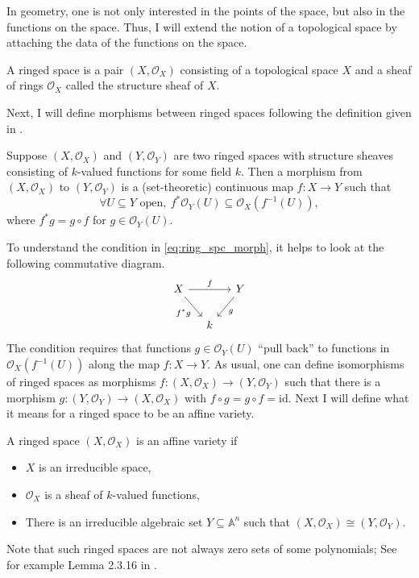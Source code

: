 In geometry, one is not only interested in the points of the space,
but also in the functions on the space. Thus, I will extend the notion of
a topological space by attaching the data of the functions on the space.
\begin{defin}
  A ringed space is a pair $(X,\mathscr{O}_{X})$ consisting of a topological
  space $X$ and a sheaf of rings $\mathscr{O}_{X}$ called the structure
  sheaf of $X$.
\end{defin}
Next, I will define morphisms between ringed spaces following the
definition given in \cite{gathmann}.
\begin{defin}
  Suppose $(X,\mathscr{O}_{X})$ and $(Y,\mathscr{O}_{Y})$ are two ringed
  spaces with structure sheaves consisting of $k$-valued functions
  for some field $k$. Then a morphism from $(X,\mathscr{O}_{X})$ to
  $(Y,\mathscr{O}_{Y})$ is a (set-theoretic) continuous map
  $f:X\to Y$ such that
  \begin{equation}\label{eq:ring_spc_morph}
    \forall U\subseteq Y\text{ open},\ f^{\ast}\mathscr{O}_{Y}(U)
    \subseteq \mathscr{O}_{X}(f^{-1}(U)),
  \end{equation}
  where $f^{\ast}g=g\circ f$ for $g\in\mathscr{O}_{Y}(U)$.
\end{defin}
To understand the condition in \eqref{eq:ring_spc_morph}, it helps to look
at the following commutative diagram.
\[\begin{tikzcd}[column sep=small]
    {X} && {Y} \\
    & k
    \arrow["{f^{\ast}g}"', from=1-1, to=2-2]
    \arrow["g", from=1-3, to=2-2]
    \arrow["f", from=1-1, to=1-3]
  \end{tikzcd}\]
The condition requires that functions $g\in\mathscr{O}_{Y}(U)$ ``pull back''
to functions in $\mathscr{O}_{X}(f^{-1}(U))$ along the map $f:X\to Y$. As
usual, one can define isomorphisms of ringed spaces as morphisms
$f:(X,\mathscr{O}_{X})\to (Y,\mathscr{O}_{Y})$ such that there is a morphism
$g:(Y,\mathscr{O}_{Y})\to (X,\mathscr{O}_{X})$ with $f\circ g=g\circ f
=\text{id}$. Next I will define what it means for a ringed space to be
an affine variety.

\begin{defin}
  A ringed space $(X,\mathscr{O}_{X})$ is an affine variety if
  \begin{itemize}
    \item $X$ is an irreducible space,
    \item $\mathscr{O}_{X}$ is a sheaf of $k$-valued functions,
    \item There is an irreducible algebraic set $Y\subseteq \mathbb{A}^{n}$
          such that $(X,\mathscr{O}_{X})\cong (Y,\mathscr{O}_{Y})$.
  \end{itemize}
\end{defin}
Note that such ringed spaces are not always zero sets of some polynomials;
See for example Lemma 2.3.16 in \cite{gathmann}.

